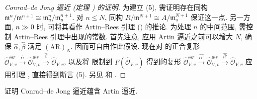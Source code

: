 \begin{proof}[Conrad--de Jong 逼近 (定理 ) 的证明]
为建立 (5), 需证明存在同构 $\mathfrak m^n/\mathfrak m^{n+1}\cong\mathfrak m_u^n/\mathfrak m_u^{n+1}$. 对 $n\leq N$, 同构 $R/\mathfrak m^{N+1}\cong A/\mathfrak m_u^{N+1}$ 保证这一点. 另一方面, $n\gg0$ 时, 可将其看作 Artin--Rees 引理 () 的推论. 为处理 $n$ 的中间范围, 需控制 Artin--Rees 引理中出现的常数. 首先注意, 应用 Artin 逼近之前可以增大 $N$, 确保 $\widehat\alpha,\widehat\beta$ 满足 $(\mathrm{AR})_N$. 因而可自由作此假设. 现在对  的正合复形 $\widehat{\mathcal O}_{V,v}^{\oplus r}\xrightarrow{\widehat\alpha}\widehat{\mathcal O}_{V,v}^{\oplus s}\xrightarrow{\widehat\beta}\widehat{\mathcal O}_{V,v}$, 以及将  限制到 $F(\widehat{\mathcal O}_{V,v})$ 得到的复形 $\widehat{\mathcal O}_{V,v}^{\oplus r}\xrightarrow{\widehat{\alpha'}}\widehat{\mathcal O}_{V,v}^{\oplus s}\xrightarrow{\widehat{\beta'}}\widehat{\mathcal O}_{V,v}$ 应用引理 , 直接得到断言 (5). 另见 \cite{CdJ02} 和 \cite[Tag 07XB]{SP}.
\end{proof}
\begin{exercise}\label{src:C.6.7}
证明 Conrad--de Jong 逼近蕴含 Artin 逼近.
\end{exercise}
